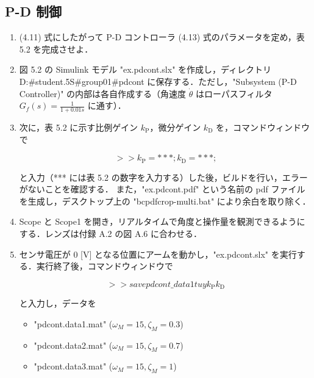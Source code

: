 \subsection{P-D 制御}

\begin{enumerate}
  \item (4.11) 式にしたがって P-D コントローラ (4.13) 式のパラメータを定め，表 5.2 を完成させよ．
        
  \item 図 5.2 の Simulink モデル "ex.pdcont.slx" を作成し，ディレクトリ D:\#student.5S\#group01\#pdcont に保存する．ただし，"Subsystem (P-D Controller)" の内部は各自作成する（角速度 $\dot{\theta}$ はローパスフィルタ $G_f(s) = \frac{1}{1 + 0.01s}$ に通す）．
        
  \item 次に，表 5.2 に示す比例ゲイン $k_{\mathrm{P}}$，微分ゲイン $k_{\mathrm{D}}$ を，コマンドウィンドウで
        
        \begin{equation}
          >> k_{\mathrm{P}} = ***; k_{\mathrm{D}} = ***;
        \end{equation}
        
        と入力（*** には表 5.2 の数字を入力する）した後，ビルドを行い，エラーがないことを確認する．
        また，"ex.pdcont.pdf" という名前の pdf ファイルを生成し，デスクトップ上の 
        "bcpdfcrop-multi.bat" により余白を取り除く．
        
  \item Scope と Scope1 を開き，リアルタイムで角度と操作量を観測できるようにする．レンズは付録 A.2 の図 A.6 に合わせる．
        
  \item センサ電圧が 0 [V] となる位置にアームを動かし，"ex.pdcont.slx" を実行する．実行終了後，コマンドウィンドウで
        
        \begin{equation}
          >> save pdcont\_data1 t u y k_{\mathrm{P}} k_{\mathrm{D}}
        \end{equation}
        
        と入力し，データを
        
        \begin{itemize}
          \item "pdcont.data1.mat" ($\omega_M = 15, \zeta_M = 0.3$)
          \item "pdcont.data2.mat" ($\omega_M = 15, \zeta_M = 0.7$)
          \item "pdcont.data3.mat" ($\omega_M = 15, \zeta_M = 1$)
        \end{itemize}
        

\end{enumerate}
